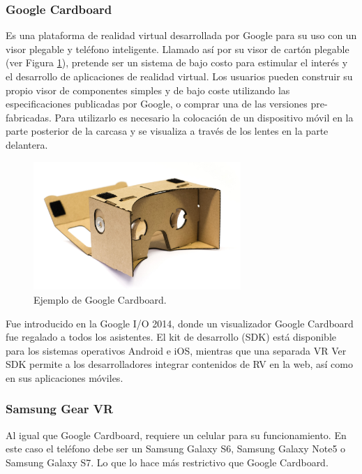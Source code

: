 \documentclass[12pt]{article}
\begin{document}
\subsubsection{Google Cardboard}
Es una plataforma de realidad virtual desarrollada por Google\cite{cardboard} para su uso con un visor plegable y teléfono inteligente. Llamado así por su visor de cartón plegable (ver Figura \ref{card}), pretende ser un sistema de bajo costo para estimular el interés y el desarrollo de aplicaciones de realidad virtual. Los usuarios pueden construir su propio visor de componentes simples y de bajo coste utilizando las especificaciones publicadas por Google, o comprar una de las versiones pre-fabricadas. Para utilizarlo es necesario  la colocación de un dispositivo móvil en la parte posterior de la carcasa y se  visualiza a través de los lentes en la parte delantera.
\begin{figure}[h!]
\includegraphics[width=0.7\textwidth,center]{google_cardboard.jpg}
\caption{Ejemplo de Google Cardboard.}
\label{card}
\end{figure}

Fue introducido en la Google I/O 2014, donde un visualizador Google Cardboard fue regalado a todos los asistentes. El kit de desarrollo (SDK) está disponible para los sistemas operativos Android e iOS, mientras que una separada VR Ver SDK permite a los desarrolladores integrar contenidos de RV en la web, así como en sus aplicaciones móviles. 
\subsubsection{Samsung Gear VR}
Al igual que Google Cardboard, requiere un celular para su funcionamiento. En este caso el teléfono debe ser un Samsung Galaxy S6, Samsung Galaxy Note5 o Samsung Galaxy S7\cite{samsungvr}. Lo que lo hace más restrictivo que Google Cardboard.
\end{document}

